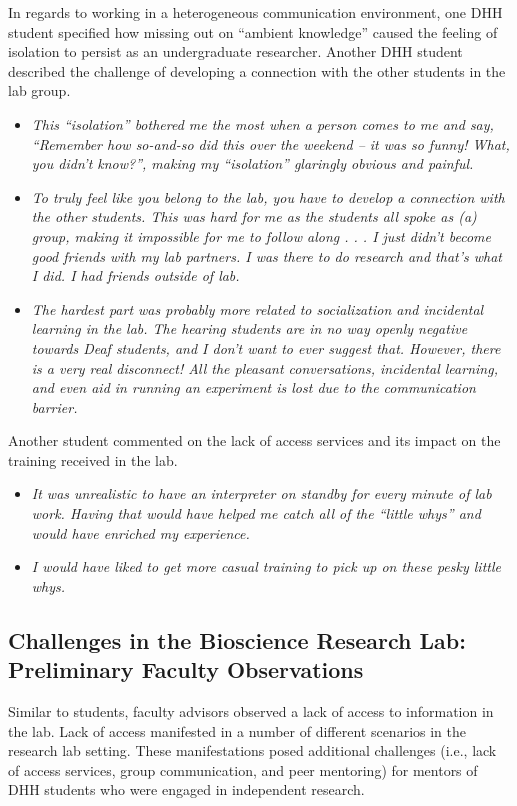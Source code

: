 \documentclass[11.5pt]{sig-alternate} %
\begin{document}
\begin{large}
In regards to working in a heterogeneous communication environment, one DHH student specified how missing out on “ambient knowledge” caused the feeling of isolation to persist as an undergraduate researcher. Another DHH student described the challenge of developing a connection with the other students in the lab group.   
\begin{itemize}
    \item \textit{This “isolation” bothered me the most when a person comes to me and say, “Remember how so-and-so did this over the weekend – it was so funny! What, you didn’t know?”, making my “isolation” glaringly obvious and painful.}
    \item \textit{To truly feel like you belong to the lab, you have to develop a connection with the other students. This was hard for me as the students all spoke as (a) group, making it impossible for me to follow along . . . I just didn’t become good friends with my lab partners. I was there to do research and that’s what I did. I had friends outside of lab.}
    \item \textit{The hardest part was probably more related to socialization and incidental learning in the lab. The hearing students are in no way openly negative towards Deaf students, and I don’t want to ever suggest that. However, there is a very real disconnect! All the pleasant conversations, incidental learning, and even aid in running an experiment is lost due to the communication barrier.}
\end{itemize}

Another student commented on the lack of access services and its impact on the training received in the lab.
\begin{itemize}
    \item \textit{It was unrealistic to have an interpreter on standby for every minute of lab work. Having that would have helped me catch all of the “little whys” and would have enriched my experience.}
    \item \textit{I would have liked to get more casual training to pick up on these pesky little whys.}
\end{itemize}

\subsection*{Challenges in the Bioscience Research Lab: Preliminary Faculty Observations}

Similar to students, faculty advisors observed a lack of access to information in the lab. Lack of access manifested in a number of different scenarios in the research lab setting. These manifestations posed additional challenges (i.e., lack of access services, group communication, and peer mentoring) for mentors of DHH students who were engaged in independent research.


\end{large}
\end{document}

